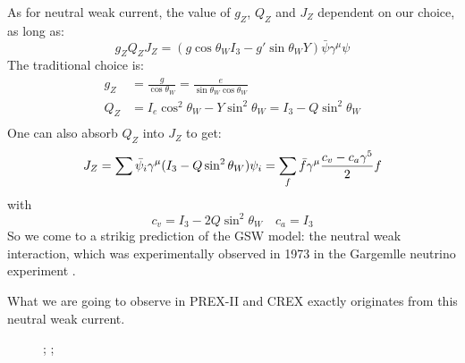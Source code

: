 As for neutral weak current, the value of $g_Z$, $Q_Z$ and $J_Z$ dependent on our choice, 
as long as:
\begin{equation}
    g_Z Q_Z J_Z = (g\cos\theta_W I_3 - g'\sin\theta_W Y)\bar{\psi}\gamma^\mu\psi 
\end{equation}
The traditional choice is:
\begin{equation}
    \begin{aligned}
	g_Z &= \frac{g}{\cos\theta_W} = \frac{e}{\sin\theta_W\cos\theta_W}  \\
	Q_Z &= I_e\cos^2\theta_W - Y\sin^2\theta_W = I_3 - Q\sin^2\theta_W  \\
    \end{aligned}
\end{equation}
One can also absorb $Q_Z$ into $J_Z$ to get:
\begin{equation}
    J_Z = \sum \bar{\psi}_i\gamma^\mu (I_3 - Q\sin^2\theta_W)\psi_i
	= \sum_f \bar{f}\gamma^\mu\frac{c_v - c_a\gamma^5}{2} f \\
\end{equation}
with 
\begin{equation}
    c_v = I_3 - 2Q\sin^2\theta_W    \quad c_a = I_3
\end{equation}
So we come to a strikig prediction of the GSW model: the neutral weak interaction,
which was experimentally observed in 1973 in the Gargemlle neutrino experiment \cite{HASERT19741}.

What we are going to observe in PREX-II and CREX exactly originates from this
neutral weak current.

\begin{figure}[!h]
    \centering
{};
;
\end{figure}

